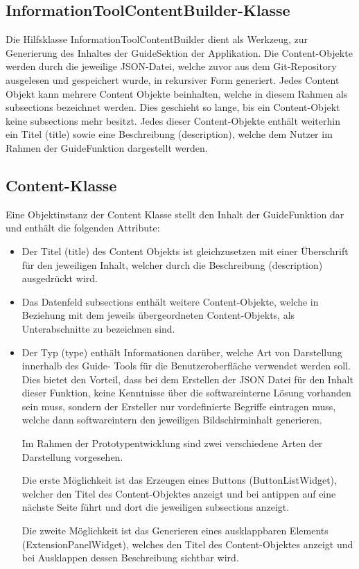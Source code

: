\documentclass[bibliography=totoc,listof=totoc,BCOR=5mm,DIV=12,oneside]{scrbook}
\begin{document}
\subsection{InformationToolContentBuilder-Klasse}
\par Die Hilfsklasse InformationToolContentBuilder dient als Werkzeug, zur Generierung des Inhaltes der \grqq Guide\grqq Sektion der Applikation. Die Content-Objekte werden durch die jeweilige JSON-Datei, welche zuvor aus dem Git-Repository ausgelesen und gespeichert wurde, in rekursiver Form generiert. Jedes Content Objekt kann mehrere Content Objekte beinhalten, welche in diesem Rahmen als subsections bezeichnet werden. Dies geschieht so lange, bis ein Content-Objekt keine subsections mehr besitzt. Jedes dieser Content-Objekte enthält weiterhin ein Titel (title) sowie eine Beschreibung (description), welche dem Nutzer im Rahmen der \grqq Guide\grqq Funktion dargestellt werden.

\newpage
\subsection{Content-Klasse}
\par Eine Objektinstanz der Content Klasse stellt den Inhalt der \grqq Guide\grqq Funktion dar und enthält die folgenden Attribute:
\begin{itemize}
\item \par Der Titel (title) des Content Objekts ist gleichzusetzen mit einer Überschrift für den jeweiligen Inhalt, welcher durch die Beschreibung (description) ausgedrückt wird.
\item \par Das Datenfeld subsections enthält weitere Content-Objekte, welche in Beziehung mit dem jeweils übergeordneten Content-Objekts, als Unterabschnitte zu bezeichnen sind.
\item \par Der Typ (type) enthält Informationen darüber, welche Art von Darstellung innerhalb des \grqq Guide\grqq - Tools für die Benutzeroberfläche verwendet werden soll. Dies bietet den Vorteil, dass bei dem Erstellen der JSON Datei für den Inhalt dieser Funktion, keine Kenntnisse über die softwareinterne Lösung vorhanden sein muss, sondern der Ersteller nur vordefinierte Begriffe eintragen muss, welche dann softwareintern den jeweiligen Bildschirminhalt generieren.
\par Im Rahmen der Prototypentwicklung sind zwei verschiedene Arten der Darstellung vorgesehen. 
\par Die erste Möglichkeit ist das Erzeugen eines Buttons (\grqq ButtonListWidget\grqq), welcher den Titel des Content-Objektes anzeigt und bei antippen auf eine nächste Seite führt und dort die jeweiligen subsections anzeigt.
\par Die zweite Möglichkeit ist das Generieren eines ausklappbaren Elements (\grqq ExtensionPanelWidget\grqq), welches den Titel des Content-Objektes anzeigt und bei Ausklappen dessen Beschreibung sichtbar wird.
\end{itemize}
\end{document}
